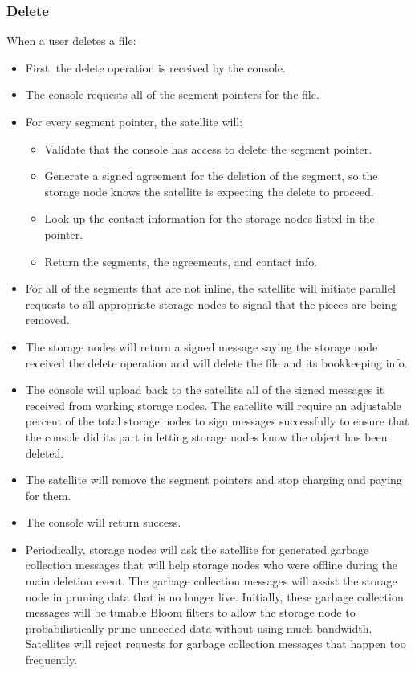 \documentclass[a4paper,10pt]{article} \usepackage[utf8]{inputenc}
\begin{document}
\subsubsection{Delete}

When a user deletes a file:

\begin{itemize}
\item First, the delete operation is received by the console.
\item The console requests all of the segment pointers for the file.
\item For every segment pointer, the satellite will:
  \begin{itemize}
  \item Validate that the console has access to delete the segment pointer.
  \item Generate a signed agreement for the deletion of the segment, so the
    storage node knows the satellite is expecting the delete to proceed.
  \item Look up the contact information for the storage nodes listed in the 
  pointer.
  \item Return the segments, the agreements, and contact info.
  \end{itemize}
\item For all of the segments that are not inline, the satellite will
  initiate parallel requests to all appropriate storage nodes to signal that the
  pieces are being removed.
\item The storage nodes will return a signed message saying the storage node 
received 
the
  delete operation and will delete the file and its bookkeeping info.
\item The console will upload back to the satellite all of the signed
  messages it received from working storage nodes. The satellite will require an
  adjustable percent of the total storage nodes to sign messages successfully
  to ensure that the console did its part in letting storage nodes know the 
  object
  has been deleted.
\item The satellite will remove the segment pointers and stop charging and
  paying for them.
\item The console will return success.
\item Periodically, storage nodes will ask the satellite for generated garbage
  collection messages that will help storage nodes who were offline during the 
  main
  deletion event.
  The garbage collection messages will assist the storage node in pruning data 
  that is
  no longer live. Initially, these garbage collection messages will be tunable
  Bloom filters to allow the storage node to probabilistically prune unneeded 
  data
  without using much bandwidth.
  Satellites will reject requests for garbage collection messages that
  happen too frequently.
\end{itemize}
\end{document}
